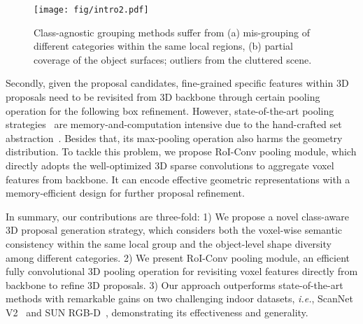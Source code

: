 \documentclass{article}
\begin{document}
\begin{figure}
  \centering
  \texttt{[image: fig/intro2.pdf]}
  \caption{Class-agnostic grouping methods suffer from (a) mis-grouping of different categories within the same local regions, (b) partial coverage of the object surfaces; outliers from the cluttered scene.}
  \label{fig:intro}
\end{figure}

Secondly, given the proposal candidates, fine-grained specific features within 3D proposals need to be revisited from 3D backbone through certain pooling operation for the following box refinement. 
However, state-of-the-art pooling strategies~\cite{shi2020pv,deng2020voxel} are memory-and-computation intensive due to the hand-crafted set abstraction~\cite{qi2017pointnet}. Besides that, its max-pooling operation also harms the geometry distribution.
To tackle this problem, we propose RoI-Conv pooling module, which directly adopts the well-optimized 3D sparse convolutions to aggregate voxel features from backbone.  It can encode effective geometric representations with a memory-efficient design for further proposal refinement.

In summary, our contributions are three-fold: 
1) We propose a novel class-aware 3D proposal generation strategy, which considers both the voxel-wise semantic consistency within the same local group and the object-level shape diversity among different categories.
2) We present RoI-Conv pooling module, an efficient fully convolutional 3D pooling operation for revisiting voxel features directly from backbone to refine 3D proposals. 
3) Our approach outperforms state-of-the-art methods with remarkable gains on two challenging indoor datasets, \textit{i.e.}, ScanNet V2~\cite{dai2017scannet} and SUN RGB-D~\cite{sunrgbd}, demonstrating its effectiveness and generality.
\end{document}
